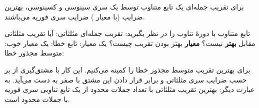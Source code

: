 \EMhold


\begin{EMtheorem}{}

برای تقریب  جمله‌ای یک تابع متناوب  توسط یک سری سینوسی و کسینوسی، بهترین ضرایب (با معیار ) ضرایب سری فوریه می‌باشند.

\end{EMtheorem}

تابع متناوب با دورهٔ تناوب \EMim{2\pi} را در نظر بگیرید:
تقریب  جمله‌ای مثلثاتی:
آیا تقریب مثلثاتی مقابل \textbf{بهتر} نیست؟
\textbf{معیار} بهتر بودن تقریب چیست؟ یک معیار: تابع خطا:
یک معیار خوب: متوسط مجذور خطا:

\begin{EMproof}{}

برای بهترین تقریب متوسط مجذور خطا را کمینه می‌کنیم. این کار با مشتق‌گیری از  بر حسب ضرایب سری مثلثاتی و برابر قرار دادن این مشتق با صفر به دست می‌آید. به عبارت دیگر:
بهترین تقریب مثلثاتی با تعداد جملات محدود از یک تابع تناوبی سری فوریه با جملات محدود است.

\end{EMproof}

